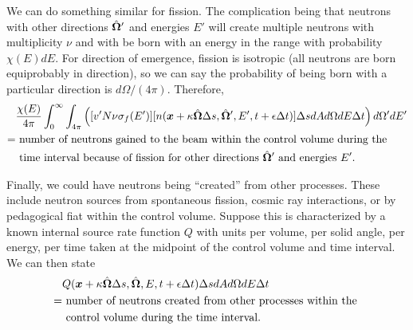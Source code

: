 We can do something similar for fission. The complication being that neutrons with other directions $\hat{\mathbf{\Omega}}'$ and energies $E'$ will create multiple neutrons with multiplicity $\nu$ and with be born with an energy in the range with probability $\chi(E) dE$. For direction of emergence, fission is isotropic (all neutrons are born equiprobably in direction), so we can say the probability of being born with a particular direction is $d\Omega / (4\pi)$. Therefore,
\begin{align}
  &\frac{\chi(E)}{4\pi} \int_0^\infty \int_{4\pi} \left( [ v' N \nu \sigma_f(E') ] [ n( \bm{x} + \kappa \hat{\mathbf{\Omega}} \Delta s, \hat{\mathbf{\Omega}}', E', t + \epsilon \Delta t )  ] \Delta s dA d\Omega dE \Delta t \right) d\Omega' dE' \nonumber \\
  =	&\text{ number of neutrons gained to the beam within the  control volume during the } \nonumber \\
  	&\text{ time interval because of fission for other directions $\hat{\mathbf{\Omega}}'$ and energies $E'$.} 
\end{align}

Finally, we could have neutrons being ``created'' from other processes. These include neutron sources from spontaneous fission, cosmic ray interactions, or by pedagogical fiat within the control volume. Suppose this is characterized by a known internal source rate function $Q$ with units per volume, per solid angle, per energy, per time taken at the midpoint of the control volume and time interval. We can then state
\begin{align}
  &Q( \bm{x} + \kappa \hat{\mathbf{\Omega}} \Delta s, \hat{\mathbf{\Omega}}, E, t + \epsilon \Delta t )  \Delta s dA d\Omega dE \Delta t \nonumber \\
  =	&\text{ number of neutrons created from other processes within the } \nonumber \\
  	&\text{ control volume during the time interval. }
\end{align}

